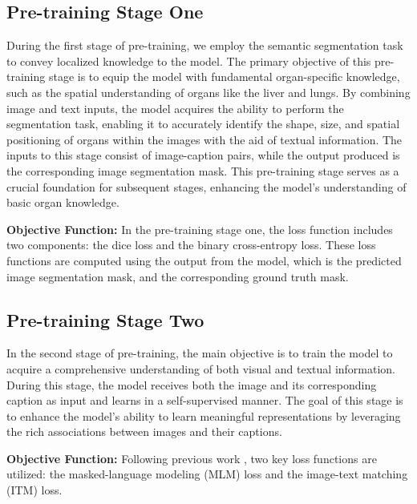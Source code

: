 \subsection{Pre-training Stage One}
\label{Stageone}
During the first stage of pre-training, we employ the semantic segmentation task to convey localized knowledge to the model. The primary objective of this pre-training stage is to equip the model with fundamental organ-specific knowledge, such as the spatial understanding of organs like the liver and lungs. By combining image and text inputs, the model acquires the ability to perform the segmentation task, enabling it to accurately identify the shape, size, and spatial positioning of organs within the images with the aid of textual information. The inputs to this stage consist of image-caption pairs, while the output produced is the corresponding image segmentation mask. This pre-training stage serves as a crucial foundation for subsequent stages, enhancing the model's understanding of basic organ knowledge.

{\bf Objective Function:}
In the pre-training stage one, the loss function includes two components: the dice loss and the binary cross-entropy loss. These loss functions are computed using the output from the model, which is the predicted image segmentation mask, and the corresponding ground truth mask. 

\subsection{Pre-training Stage Two}
\label{Stagetwo}
In the second stage of pre-training, the main objective is to train the model to acquire a comprehensive understanding of both visual and textual information. During this stage, the model receives both the image and its corresponding caption as input and learns in a self-supervised manner. The goal of this stage is to enhance the model's ability to learn meaningful representations by leveraging the rich associations between images and their captions.

{\bf Objective Function:}
Following previous work \cite{chen2022align, chen2022multi}, two key loss functions are utilized: the masked-language modeling (MLM) loss and the image-text matching (ITM) loss.

